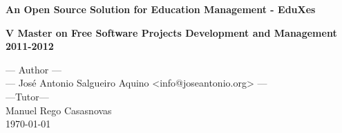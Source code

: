 \documentclass[twoside,a4paper,12pt]{book}
\begin{document}
\renewcommand{\captionlabelfont}{\textbf}

\pagestyle{fancy}

\fancyhf{}
%
\renewcommand{\headrulewidth}{0.5pt}

\fancyhead[LO]{\rightmark} %

\fancyhead[RE]{\leftmark} %

\fancyhead[RO,LE]{\thepage} %
%

\thispagestyle{empty}

\baselineskip

\vspace{2cm}
%
%
\begin{center}

%
\vspace{5mm}

%

%
\vspace{4.5cm}
%
%
%

{\Large {\bf An Open Source Solution for Education Management - 
EduXes}}

\vspace{3cm}

%
{\large {\bf 
V Master on Free Software Projects Development and Management 2011-2012}}
%
%
\vspace{4cm}


--- Author --- \\

--- Jos\'e Antonio Salgueiro Aquino <info@joseantonio.org>  ---\\
\vspace{1cm}
---Tutor---\\ 
Manuel Rego Casasnovas\\
\vspace{1cm} \today

%
\end{center}
\newpage{\pagestyle{empty}\cleardoublepage}
\end{document}
